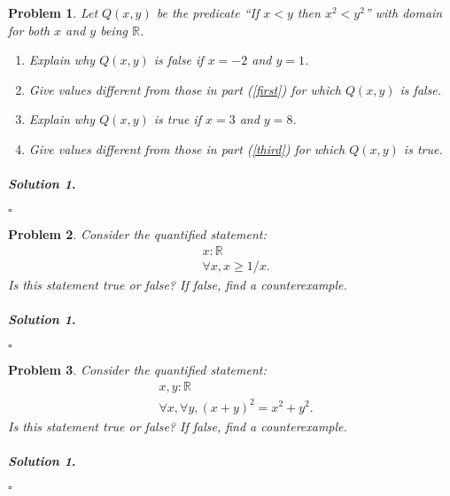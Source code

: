 \documentclass{amsart}
\theoremstyle{plain}
\newtheorem{problem}{Problem}
\newenvironment{solution}{\paragraph{\emph{Solution 1}.}}{\hfill$\square$}
\begin{document}
\begin{problem}
Let $Q(x,y)$ be the predicate ``If $x<y$ then $x^{2}<y^{2}$'' with domain for both $x$ and $y$ being $\mathbb{R}$.
\begin{enumerate}
\item Explain why $Q(x,y)$ is false if $x = -2$ and $y=1$. \label{first}
\item Give values different from those in part (\ref{first}) for which $Q(x,y)$ is false.
\item Explain why $Q(x,y)$ is true if $x=3$ and $y=8$. \label{third}
\item Give values different from those in part (\ref{third}) for which $Q(x,y)$ is true.
\end{enumerate}
\end{problem}

\begin{solution}

\end{solution}

\begin{problem}
Consider the quantified statement:
\begin{equation*}
\begin{aligned}
&x: \mathbb{R}\\
&\forall x, x \ge 1/x.
\end{aligned}
\end{equation*}
Is this statement true or false?  If false, find a counterexample.
\end{problem}

\begin{solution}

\end{solution}


\begin{problem}
Consider the quantified statement:
\begin{equation*}
\begin{aligned}
&x,y : \mathbb{R}\\
&\forall x,\forall y, (x + y)^2 = x^2 + y^2.
\end{aligned}
\end{equation*}
Is this statement true or false?  If false, find a counterexample.
\end{problem}

\begin{solution}

\end{solution}
\end{document}
